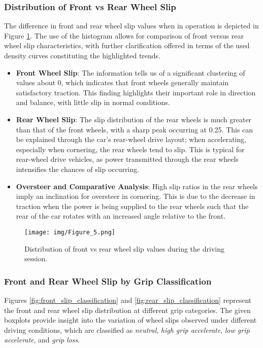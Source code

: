 \documentclass[a4paper,final,12pt]{report}
\begin{document}
\subsubsection{Distribution of Front vs Rear Wheel Slip}
The difference in front and rear wheel slip values when in operation is depicted in Figure \ref{fig:front_rear_slip_distribution}. The use of the histogram allows for comparison of front versus rear wheel slip characteristics, with further clarification offered in terms of the used density curves constituting the highlighted trends.

\begin{itemize}
    \item \textbf{Front Wheel Slip}: The information tells us of a significant clustering of values about 0, which indicates that front wheels generally maintain satisfactory traction. This finding highlights their important role in direction and balance, with little slip in normal conditions.
    \item \textbf{Rear Wheel Slip}: The slip distribution of the rear wheels is much greater than that of the front wheels, with a sharp peak occurring at 0.25. This can be explained through the car's rear-wheel drive layout; when accelerating, especially when cornering, the rear wheels tend to slip. This is typical for rear-wheel drive vehicles, as power transmitted through the rear wheels intensifies the chances of slip occurring.
    \item \textbf{Oversteer and Comparative Analysis}: High slip ratios in the rear wheels imply an inclination for oversteer in cornering. This is due to the decrease in traction when the power is being supplied to the rear wheels such that the rear of the car rotates with an increased angle relative to the front.
\end{itemize}
\begin{figure}[H]
    \centering
    \texttt{[image: img/Figure\_5.png]}
    \caption{Distribution of front vs rear wheel slip values during the driving session.}
    \label{fig:front_rear_slip_distribution}
\end{figure}

\subsubsection{Front and Rear Wheel Slip by Grip Classification}
Figures \ref{fig:front_slip_classification} and \ref{fig:rear_slip_classification} represent the front and rear wheel slip distribution at different grip categories. The given boxplots provide insight into the variation of wheel slips observed under different driving conditions, which are classified as \textit{neutral}, \textit{high grip accelerate}, \textit{low grip accelerate}, and \textit{grip loss}.
\end{document}
